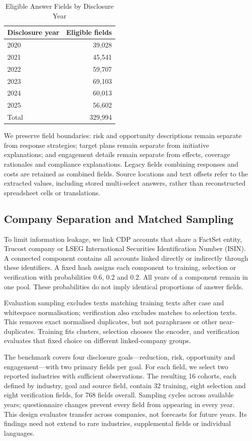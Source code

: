 \documentclass[12pt]{article}
\begin{document}
\begin{table}[htbp]
\centering
\caption{Eligible Answer Fields by Disclosure Year}
\label{tab:field_counts}
\begin{tabular}{@{}lr@{}}
\toprule
Disclosure year & Eligible fields \\
\midrule
2020 & 39,028 \\
2021 & 45,541 \\
2022 & 59,707 \\
2023 & 69,103 \\
2024 & 60,013 \\
2025 & 56,602 \\
\midrule
Total & 329,994 \\
\bottomrule
\end{tabular}
\end{table}

We preserve field boundaries: risk and opportunity descriptions remain separate from response strategies; target plans remain separate from initiative explanations; and engagement details remain separate from effects, coverage rationales and compliance explanations. Legacy fields combining responses and costs are retained as combined fields. Source locations and text offsets refer to the extracted values, including stored multi-select answers, rather than reconstructed spreadsheet cells or translations.

\subsection{Company Separation and Matched Sampling}
To limit information leakage, we link CDP accounts that share a FactSet entity, Trucost company or LSEG International Securities Identification Number (ISIN). A connected component contains all accounts linked directly or indirectly through these identifiers. A fixed hash assigns each component to training, selection or verification with probabilities 0.6, 0.2 and 0.2. All years of a component remain in one pool. These probabilities do not imply identical proportions of answer fields.

Evaluation sampling excludes texts matching training texts after case and whitespace normalisation; verification also excludes matches to selection texts. This removes exact normalised duplicates, but not paraphrases or other near-duplicates. Training fits clusters, selection chooses the encoder, and verification evaluates that fixed choice on different linked-company groups.

The benchmark covers four disclosure goals---reduction, risk, opportunity and engagement---with two primary fields per goal. For each field, we select two reported industries with sufficient observations. The resulting 16 cohorts, each defined by industry, goal and source field, contain 32 training, eight selection and eight verification fields, for 768 fields overall. Sampling cycles across available years; questionnaire changes prevent every field from appearing in every year. This design evaluates transfer across companies, not forecasts for future years. Its findings need not extend to rare industries, supplemental fields or individual languages.
\end{document}
